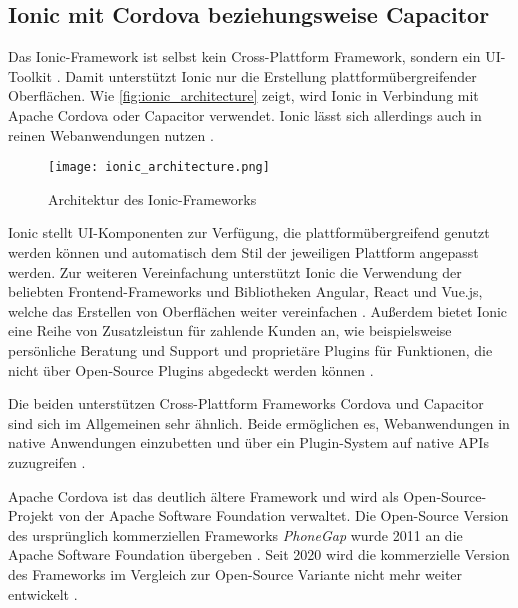 \subsection{Ionic mit Cordova beziehungsweise Capacitor}
\label{sec:Frameworks_Ionic}

Das Ionic-Framework ist selbst kein Cross-Plattform Framework, sondern ein UI-Toolkit \cite{Ionic_Docs}.
Damit unterstützt Ionic nur die Erstellung plattformübergreifender Oberflächen.
Wie \autoref{fig:ionic_architecture} zeigt, wird Ionic in Verbindung mit Apache Cordova oder Capacitor verwendet.
Ionic lässt sich allerdings auch in reinen Webanwendungen nutzen \cite{Ionic_Docs}.
\begin{figure}[h]
    \centering
    \texttt{[image: ionic\_architecture.png]}
    \caption{Architektur des Ionic-Frameworks \cite{Ionic_Architektur}}
    \label{fig:ionic_architecture}
\end{figure}


Ionic stellt \ac{UI}-Komponenten zur Verfügung, die plattformübergreifend genutzt werden können und automatisch dem Stil der jeweiligen Plattform angepasst werden.
Zur weiteren Vereinfachung unterstützt Ionic die Verwendung der beliebten Frontend-Frameworks und Bibliotheken Angular, React und Vue.js, welche das Erstellen von Oberflächen weiter vereinfachen \cite{Ionic_Docs, Ionic_EvaluationGuide}.
Außerdem bietet Ionic eine Reihe von Zusatzleistun für zahlende Kunden an, wie beispielsweise persönliche Beratung und Support und proprietäre Plugins für Funktionen, die nicht über Open-Source Plugins abgedeckt werden können \cite{Ionic_EvaluationGuide}.



Die beiden unterstützen Cross-Plattform Frameworks Cordova und Capacitor sind sich im Allgemeinen sehr ähnlich.
Beide ermöglichen es, Webanwendungen in native Anwendungen einzubetten und über ein Plugin-System auf native \acp{API} zuzugreifen \cite{Ionic_Cordova_vs_Capacitor}.


Apache Cordova ist das deutlich ältere Framework und wird als Open-Source-Projekt von der Apache Software Foundation verwaltet.
Die Open-Source Version des ursprünglich kommerziellen Frameworks \textit{PhoneGap} wurde 2011 an die Apache Software Foundation übergeben \cite{Steyer_Cordova}.
Seit 2020 wird die kommerzielle Version des Frameworks im Vergleich zur Open-Source Variante nicht mehr weiter entwickelt \cite{Adobe_PhoneGap_EOL}.


